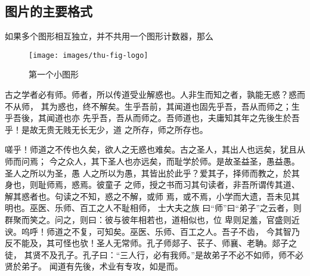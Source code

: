 \documentclass{scuthesis}
\begin{document}
\subsection{图片的主要格式}
如果多个图形相互独立，并不共用一个图形计数器，那么

\begin{figure}[h]
  \centering%
    \texttt{[image: images/thu-fig-logo]}
    \caption{第一个小图形}
\end{figure}

古之学者必有师。师者，所以传道受业解惑也。人非生而知之者，孰能无惑？惑而不从师，
其为惑也，终不解矣。生乎吾前，其闻道也固先乎吾，吾从而师之；生乎吾後，其闻道也亦
先乎吾，吾从而师之。吾师道也，夫庸知其年之先後生於吾乎！是故无贵无贱无长无少，道
之所存，师之所存也。

嗟乎！师道之不传也久矣，欲人之无惑也难矣。古之圣人，其出人也远矣，犹且从师而问焉；
今之众人，其下圣人也亦远矣，而耻学於师。是故圣益圣，愚益愚。圣人之所以为圣，愚
人之所以为愚，其皆出於此乎？爱其子，择师而教之，於其身也，则耻师焉，惑焉。彼童子
之师，授之书而习其句读者，非吾所谓传其道、解其惑者也。句读之不知，惑之不解，或师
焉，或不焉，小学而大遗，吾未见其明也。巫医、乐师、百工之人不耻相师，  士大夫之族
曰“师”曰“弟子”之云者，则群聚而笑之。问之，则曰：彼与彼年相若也，道相似也，位
卑则足羞，官盛则近谀。呜呼！师道之不复，可知矣。巫医、乐师、百工之人。吾子不齿，
今其智乃反不能及，其可怪也欤！圣人无常师。孔子师郯子、苌子、师襄、老聃。郯子之徒，
其贤不及孔子。孔子曰：“三人行，必有我师。”是故弟子不必不如师，师不必贤於弟子。
闻道有先後，术业有专攻，如是而。


\end{document}
